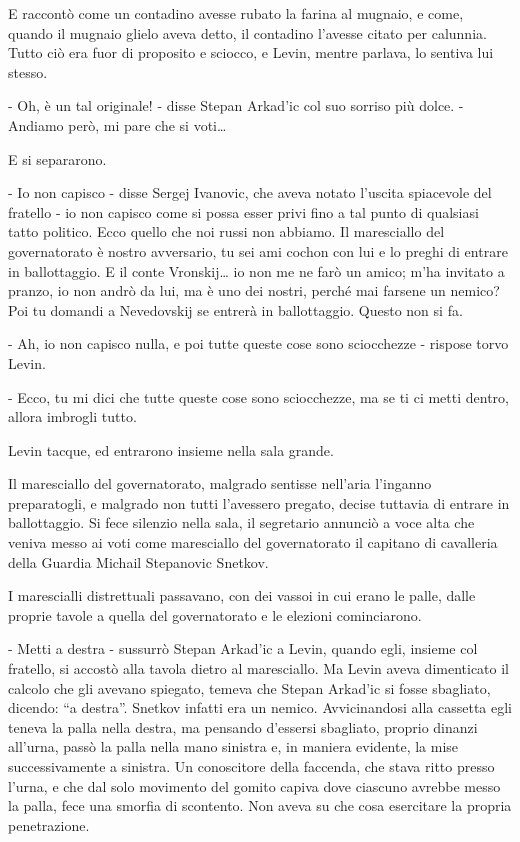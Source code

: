 E raccontò come un contadino avesse rubato la farina al mugnaio, e come, quando il mugnaio glielo aveva detto, il contadino l'avesse citato per calunnia. Tutto ciò era fuor di proposito e sciocco, e Levin, mentre parlava, lo sentiva lui stesso. 

- Oh, è un tal originale! - disse Stepan Arkad'ic col suo sorriso più dolce. - Andiamo però, mi pare che si voti\ldots{} 

E si separarono. 

- Io non capisco - disse Sergej Ivanovic, che aveva notato l'uscita spiacevole del fratello - io non capisco come si possa esser privi fino a tal punto di qualsiasi tatto politico. Ecco quello che noi russi non abbiamo. Il maresciallo del governatorato è nostro avversario, tu sei ami cochon con lui e lo preghi di entrare in ballottaggio. E il conte Vronskij\ldots{} io non me ne farò un amico; m'ha invitato a pranzo, io non andrò da lui, ma è uno dei nostri, perché mai farsene un nemico? Poi tu domandi a Nevedovskij se entrerà in ballottaggio. Questo non si fa. 

- Ah, io non capisco nulla, e poi tutte queste cose sono sciocchezze - rispose torvo Levin. 

- Ecco, tu mi dici che tutte queste cose sono sciocchezze, ma se ti ci metti dentro, allora imbrogli tutto. 

Levin tacque, ed entrarono insieme nella sala grande. 

Il maresciallo del governatorato, malgrado sentisse nell'aria l'inganno preparatogli, e malgrado non tutti l'avessero pregato, decise tuttavia di entrare in ballottaggio. Si fece silenzio nella sala, il segretario annunciò a voce alta che veniva messo ai voti come maresciallo del governatorato il capitano di cavalleria della Guardia Michail Stepanovic Snetkov. 

I marescialli distrettuali passavano, con dei vassoi in cui erano le palle, dalle proprie tavole a quella del governatorato e le elezioni cominciarono. 

- Metti a destra - sussurrò Stepan Arkad'ic a Levin, quando egli, insieme col fratello, si accostò alla tavola dietro al maresciallo. Ma Levin aveva dimenticato il calcolo che gli avevano spiegato, temeva che Stepan Arkad'ic si fosse sbagliato, dicendo: ``a destra''. Snetkov infatti era un nemico. Avvicinandosi alla cassetta egli teneva la palla nella destra, ma pensando d'essersi sbagliato, proprio dinanzi all'urna, passò la palla nella mano sinistra e, in maniera evidente, la mise successivamente a sinistra. Un conoscitore della faccenda, che stava ritto presso l'urna, e che dal solo movimento del gomito capiva dove ciascuno avrebbe messo la palla, fece una smorfia di scontento. Non aveva su che cosa esercitare la propria penetrazione. 

